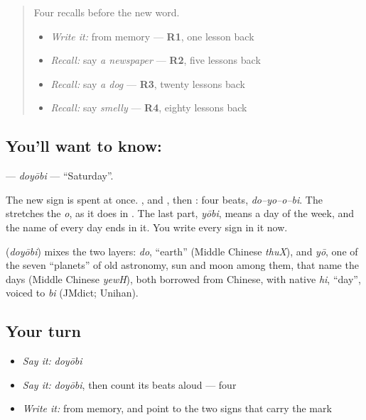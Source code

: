 \begin{quote}
Four recalls before the new word.

\begin{itemize}
\raggedright
  \item \emph{Write it:} \textbf{} from memory — \textbf{R1}, one lesson back
  \item \emph{Recall:} say \emph{a newspaper} — \textbf{R2}, five lessons back
  \item \emph{Recall:} say \emph{a dog} — \textbf{R3}, twenty lessons back
  \item \emph{Recall:} say \emph{smelly} — \textbf{R4}, eighty lessons back
\end{itemize}
\end{quote}

\subsection*{You'll want to know: }
\textbf{} — \emph{doyōbi} — \textquotedblleft{}Saturday\textquotedblright{}.

The new sign is spent at once. \textbf{}, \textbf{} and \textbf{}, then \textbf{}: four beats, \emph{do–yo–o–bi}. The \textbf{} stretches the \emph{o}, as it does in \textbf{}. The last part, \emph{yōbi}, means a day of the week, and the name of every day ends in it. You write every sign in it now.

\begin{cousinweb}
\textbf{} (\emph{doyōbi}) mixes the two layers: \emph{do}, \textquotedblleft{}earth\textquotedblright{} (Middle Chinese \emph{thuX}), and \emph{yō}, one of the seven \textquotedblleft{}planets\textquotedblright{} of old astronomy, sun and moon among them, that name the days (Middle Chinese \emph{yewH}), both borrowed from Chinese, with native \emph{hi}, \textquotedblleft{}day\textquotedblright{}, voiced to \emph{bi} (JMdict; Unihan).
\end{cousinweb}

\subsection*{Your turn}
\begin{itemize}
\raggedright
  \item \emph{Say it:} \emph{doyōbi}
  \item \emph{Say it:} \emph{doyōbi}, then count its beats aloud — four
  \item \emph{Write it:} \textbf{} from memory, and point to the two signs that carry the mark
\end{itemize}

